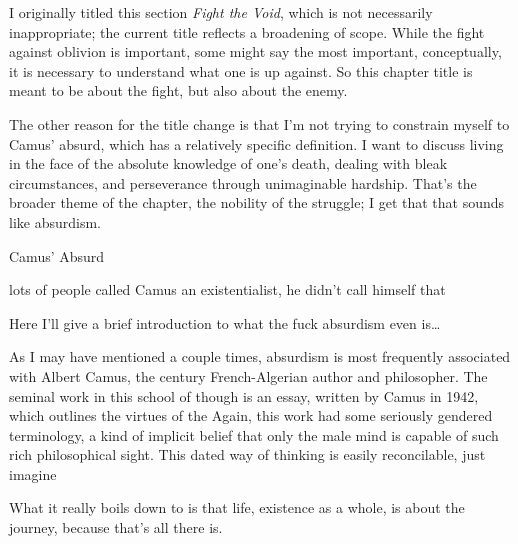 \documentclass[../butidigress.tex]{subfiles}
\begin{document}
I originally titled this section \textit{Fight the Void}, which is not necessarily inappropriate; the current title reflects a broadening of scope.
While the fight against oblivion is important, some might say the most important, conceptually, it is necessary to understand what one is up against.
So this chapter title is meant to be about the fight, but also about the enemy.

The other reason for the title change is that I'm not trying to constrain myself to Camus' absurd, which has a relatively specific definition.
I want to discuss living in the face of the absolute knowledge of one's death, dealing with bleak circumstances, and perseverance through unimaginable hardship.
That's the broader theme of the chapter, the nobility of the struggle; I get that that sounds like absurdism.


\begin{somenotes}{Camus' Absurd}
    \item lots of people called Camus an existentialist, he didn't call himself that
\end{somenotes}

Here I'll give a brief introduction to what the fuck absurdism even is\ldots

As I may have mentioned a couple times, absurdism is most frequently associated with Albert Camus, the  century French-Algerian author and philosopher.
The seminal work in this school of though is  an essay, written by Camus in 1942, which outlines the virtues of the 
Again, this work had some seriously gendered terminology, a kind of implicit belief that only the male mind is capable of such rich philosophical sight.
This dated way of thinking is easily reconcilable, just imagine 

What it really boils down to is that life, existence as a whole, is about the journey, because that's all there is.\autocite{mythofsisyphus}
\end{document}
